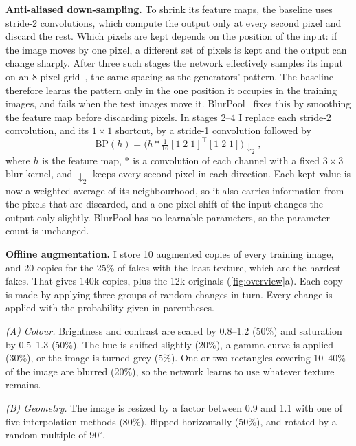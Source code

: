 \noindent\textbf{Anti-aliased down-sampling.} To shrink its feature maps, the baseline uses stride-2 convolutions, which compute the output only at every second pixel and discard the rest. Which pixels are kept depends on the position of the input: if the image moves by one pixel, a different set of pixels is kept and the output can change sharply. After three such stages the network effectively samples its input on an 8-pixel grid~\cite{azulay2019small}, the same spacing as the generators' pattern. The baseline therefore learns the pattern only in the one position it occupies in the training images, and fails when the test images move it. BlurPool~\cite{zhang2019blurpool} fixes this by smoothing the feature map before discarding pixels. In stages 2--4 I replace each stride-2 convolution, and its $1\times1$ shortcut, by a stride-1 convolution followed by
\begin{equation}
  \mathrm{BP}(h) = \big(h * \tfrac{1}{16}[1\;2\;1]^{\top}[1\;2\;1]\big)\!\downarrow_2 ,
\end{equation}
where $h$ is the feature map, $*$ is a convolution of each channel with a fixed $3\times3$ blur kernel, and $\downarrow_2$ keeps every second pixel in each direction. Each kept value is now a weighted average of its neighbourhood, so it also carries information from the pixels that are discarded, and a one-pixel shift of the input changes the output only slightly. BlurPool has no learnable parameters, so the parameter count is unchanged.

\noindent\textbf{Offline augmentation.} I store 10 augmented copies of every training image, and 20 copies for the 25\% of fakes with the least texture, which are the hardest fakes. That gives 140k copies, plus the 12k originals (\cref{fig:overview}a). Each copy is made by applying three groups of random changes in turn. Every change is applied with the probability given in parentheses.

\noindent\emph{(A) Colour.} Brightness and contrast are scaled by 0.8--1.2 (50\%) and saturation by 0.5--1.3 (50\%). The hue is shifted slightly (20\%), a gamma curve is applied (30\%), or the image is turned grey (5\%). One or two rectangles covering 10--40\% of the image are blurred (20\%), so the network learns to use whatever texture remains.

\noindent\emph{(B) Geometry.} The image is resized by a factor between 0.9 and 1.1 with one of five interpolation methods (80\%), flipped horizontally (50\%), and rotated by a random multiple of $90^\circ$.

